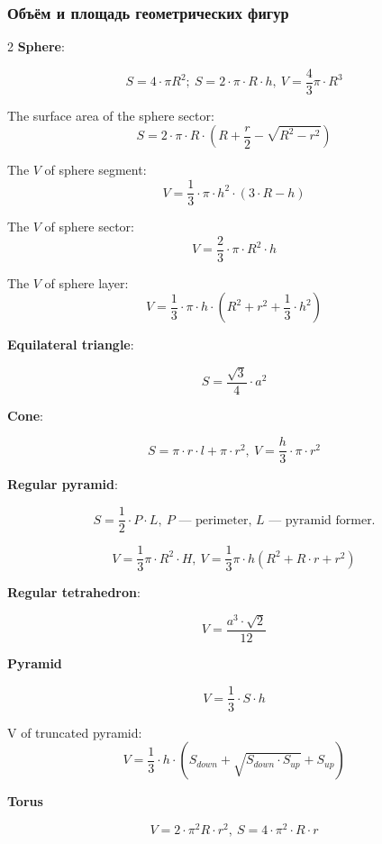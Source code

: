 \subsubsection {Объём и площадь геометрических фигур}
\begin{minipage}{0.48\textwidth}
	\begin{multicols}{2}
	\textbf {Sphere}:

	$$S = 4 \cdot \pi R^2;\ S = 2 \cdot \pi \cdot R\cdot h,\ V = \frac{4}{3} \pi \cdot R^3$$

	The surface area of the sphere sector: 
	$$S = 2 \cdot\pi \cdot R \cdot (R + \frac{r}{2} - \sqrt{R^2 - r^2}) $$
	
	The $V$ of sphere segment: 
	$$V = \frac{1}{3} \cdot \pi \cdot h^2 \cdot (3\cdot R - h)$$

	The $V$ of sphere sector: 
	$$V = \frac{2}{3} \cdot \pi \cdot R^2 \cdot h$$

	The $V$ of sphere layer: 
	$$V = \frac{1}{3} \cdot \pi \cdot h \cdot (R^2 + r^2 + \frac{1}{3} \cdot h^2)$$


	\textbf {Equilateral triangle}:

	$$S = \frac{\sqrt{3}}{4} \cdot a^2$$

	\textbf {Cone}:

	$$S = \pi \cdot r \cdot l + \pi \cdot r^2,\ V = \frac{h}{3} \cdot \pi \cdot r^2$$

	\textbf {Regular pyramid}:

	$$S = \frac{1}{2}\cdot P \cdot L,\ \text {$P$ --- perimeter, $L$ --- pyramid former.}$$

	$$V = \frac{1}{3}\pi \cdot R^2 \cdot H,\ V = \frac{1}{3}\pi \cdot h (R^2 + R\cdot r + r^2)$$

	\textbf{Regular tetrahedron}:

	$$V = \frac{a^3 \cdot \sqrt{2}}{12} $$

	\textbf{Pyramid}

	$$V = \frac{1}{3} \cdot S \cdot h$$

	V of truncated pyramid: $$V = \frac{1}{3} \cdot h \cdot(S_{down} + \sqrt{S_{down} \cdot S_{up}} + S_{up}) $$

	\textbf {Torus}

	$$V = 2 \cdot \pi^2 R \cdot r^2,\ S = 4 \cdot \pi^2 \cdot R \cdot r$$

	\end{multicols}
\end{minipage}


